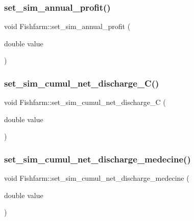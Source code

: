 \mbox{\label{class_fishfarm_a181badf8c288fa84e94324707c93bc06}} 
\subsubsection{\texorpdfstring{set\_sim\_annual\_profit()}{set\_sim\_annual\_profit()}}
{\footnotesize\ttfamily void Fishfarm\+::set\+\_\+sim\+\_\+annual\+\_\+profit (\begin{DoxyParamCaption}\item[{double}]{value }\end{DoxyParamCaption})}

\mbox{\label{class_fishfarm_aa38a1c92bec4b2b01b48b115a1bca011}} 
\subsubsection{\texorpdfstring{set\_sim\_cumul\_net\_discharge\_C()}{set\_sim\_cumul\_net\_discharge\_C()}}
{\footnotesize\ttfamily void Fishfarm\+::set\+\_\+sim\+\_\+cumul\+\_\+net\+\_\+discharge\+\_\+C (\begin{DoxyParamCaption}\item[{double}]{value }\end{DoxyParamCaption})}

\mbox{\label{class_fishfarm_a23ecd40fe5f2a6f5ff193e1b363932c6}} 
\subsubsection{\texorpdfstring{set\_sim\_cumul\_net\_discharge\_medecine()}{set\_sim\_cumul\_net\_discharge\_medecine()}}
{\footnotesize\ttfamily void Fishfarm\+::set\+\_\+sim\+\_\+cumul\+\_\+net\+\_\+discharge\+\_\+medecine (\begin{DoxyParamCaption}\item[{double}]{value }\end{DoxyParamCaption})}


